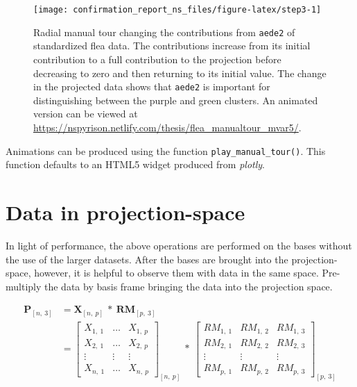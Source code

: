 \documentclass{monashthesis}
\begin{document}
\begin{figure}

{\centering \texttt{[image: confirmation\_report\_ns\_files/figure-latex/step3-1]} 

}

\caption{Radial manual tour changing the contributions from
\texttt{aede2} of standardized flea data. The contributions increase
from its initial contribution to a full contribution to the projection
before decreasing to zero and then returning to its initial value. The
change in the projected data shows that \texttt{aede2} is important for
distinguishing between the purple and green clusters. An animated
version can be viewed at
\url{https://nspyrison.netlify.com/thesis/flea_manualtour_mvar5/}.}\label{fig:step3}
\end{figure}

Animations can be produced using the function
\texttt{play\_manual\_tour()}. This function defaults to an HTML5 widget
produced from \emph{plotly}.

\section{Data in projection-space}\label{sec:display}

In light of performance, the above operations are performed on the bases
without the use of the larger datasets. After the bases are brought into
the projection-space, however, it is helpful to observe them with data
in the same space. Pre-multiply the data by basis frame bringing the
data into the projection space.

\begin{align}
  \textbf{P}_{[n,~3]}
    &= \textbf{X}_{[n,~p]} ~*~ \textbf{RM}_{[p,~3]} \\
    &=
      \begin{bmatrix}
          X_{1,~1} & \dots & X_{1,~p} \\
          X_{2,~1} & \dots & X_{2,~p} \\
          \vdots   & \vdots & \vdots  \\
          X_{n,~1} & \dots & X_{n,~p}
      \end{bmatrix}_{[n,~p]}
      ~*~
      \begin{bmatrix}
        RM_{1,~1} & RM_{1,~2} & RM_{1,~3} \\
        RM_{2,~1} & RM_{2,~2} & RM_{2,~3} \\
        \vdots     & \vdots     & \vdots  \\
        RM_{p,~1} & RM_{p,~2} & RM_{p,~3}
      \end{bmatrix}_{[p,~3]}
\end{align}
\end{document}
